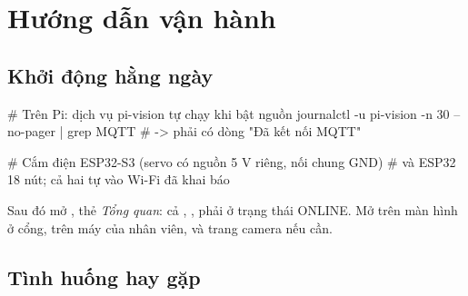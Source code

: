 \section{Hướng dẫn vận hành}

\subsection{Khởi động hằng ngày}

\begin{lenh}
# Trên Pi: dịch vụ pi-vision tự chạy khi bật nguồn
journalctl -u pi-vision -n 30 --no-pager | grep MQTT
#   -> phải có dòng "Đã kết nối MQTT"

# Cắm điện ESP32-S3 (servo có nguồn 5 V riêng, nối chung GND)
# và ESP32 18 nút; cả hai tự vào Wi-Fi đã khai báo
\end{lenh}

Sau đó mở , thẻ \emph{Tổng quan}: cả , ,  phải ở trạng thái ONLINE. Mở  trên màn hình ở cổng,  trên máy của nhân viên, và trang camera  nếu cần.

\subsection{Tình huống hay gặp}

